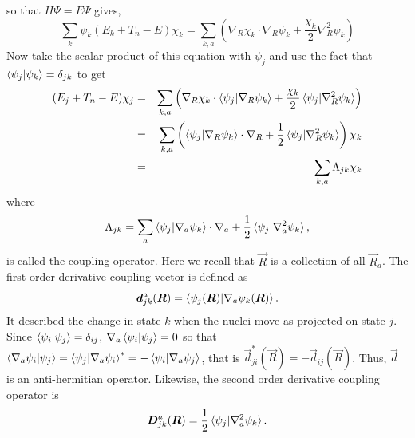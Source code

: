so that $H\Psi = E\Psi$ gives,
\begin{equation}\label{c2e28}
\sum_k\psi_k(E_k + T_n - E)\chi_k = 
\sum_{k,a}\left(\nabla_R\chi_k\cdot\nabla_R\psi_k + 
\frac{\chi_k}{2}\nabla_R^2\psi_k\right) 
\end{equation}
Now take the scalar product of this equation with $\psi_j$ and use the fact that
$\braket{\psi_j|\psi_k} = \delta_{jk}$ to get
\begin{eqnarray}
(E_j + T_n - E)\chi_j &=& 
\sum_{k,a}\left(\nabla_R\chi_k\cdot\braket{\psi_j|\nabla_R\psi_k} + 
\frac{\chi_k}{2}\braket{\psi_j|\nabla_R^2\psi_k}\right) \\
&=& \sum_{k,a}\left(\braket{\psi_j|\nabla_R\psi_k}\cdot\nabla_R + \frac{1}{2} 
\braket{\psi_j|\nabla_R^2\psi_k}\right)\chi_k \nonumber \\
&=& \sum_{k,a}\Lambda_{jk}\chi_k \label{c2e29}
\end{eqnarray}
where
\begin{equation}\label{c2e30}
\Lambda_{jk} = \sum_a \braket{\psi_j|\nabla_a\psi_k}\cdot\nabla_a + 
\frac{1}{2}\braket{\psi_j|\nabla_a^2\psi_k},
\end{equation}
is called the coupling operator. Here we recall that $\vec{R}$ is a collection
of all $\vec{R}_a$. The first order derivative coupling vector is defined as
\begin{equation}\label{c2e31}
\bm{d}_{jk}^a(\bm{R}) = \braket{\psi_j(\bm{R})|\nabla_a\psi_k(\bm{R})}.
\end{equation}
It described the change in state $k$ when the nuclei move as projected on state
$j$. Since $\braket{\psi_i|\psi_j} = \delta_{ij}$, 
$\nabla_a\braket{\psi_i|\psi_j} = 0$ so that $\braket{\nabla_a\psi_i|\psi_j}
= \braket{\psi_j|\nabla_a\psi_i}^\ast = -\braket{\psi_i|\nabla_a\psi_j}$, that is
$\vec{d}_{ji}^\ast(\vec{R}) = -\vec{d}_{ij}(\vec{R})$. Thus, $\vec{d}$ is an
anti-hermitian operator. Likewise, the second order derivative coupling operator
is
\begin{equation}\label{c2e32}
\bm{D}_{jk}^a(\bm{R}) = \frac{1}{2}\braket{\psi_j|\nabla_a^2\psi_k}.
\end{equation}

